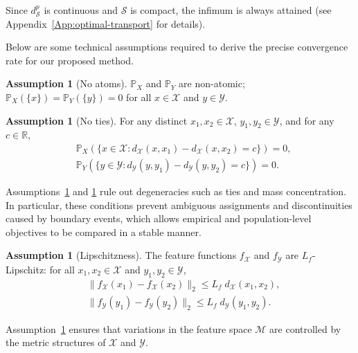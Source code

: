 \documentclass{article}
\theoremstyle{plain}
\theoremstyle{definition}
\newtheorem{assumption}[theorem]{Assumption}
\theoremstyle{remark}
\begin{document}
Since $d_{\mathcal{S}}^p$ is continuous and $\mathcal{S}$ is compact, the infimum is always attained (see Appendix~\ref{App:optimal-transport} for details).

Below are some technical assumptions required to derive the precise convergence rate for our proposed method.
\begin{assumption}[No atoms]
	\label{ass:non-atomic}
	$\mathbb{P}_X$ and $\mathbb{P}_Y$ are non-atomic; $\mathbb{P}_X(\{x\}) = \mathbb{P}_Y(\{y\}) = 0$ for all $x \in \mathcal{X}$ and $y \in \mathcal{Y}$.
\end{assumption}
\begin{assumption}[No ties]
	\label{ass:no-tie}
	For any distinct $x_1,x_2 \in \mathcal{X}$, $y_1,y_2 \in \mathcal{Y}$, and for any $c \in \mathbb{R}$,
	\begin{align*}
		&\mathbb{P}_X(\{x \in \mathcal{X}: d_{\mathcal{X}}(x,x_1) - d_{\mathcal{X}}(x,x_2) = c\}) = 0 ,\\
		&\mathbb{P}_Y(\{y \in \mathcal{Y}: d_{\mathcal{Y}}(y,y_1) - d_{\mathcal{Y}}(y,y_2) = c\}) = 0 .
	\end{align*}
\end{assumption}
Assumptions~\ref{ass:non-atomic} and \ref{ass:no-tie} rule out degeneracies such as ties and mass concentration. In particular, these conditions prevent ambiguous assignments and discontinuities caused by boundary events, which allows empirical and population-level objectives to be compared in a stable manner.

\begin{assumption}[Lipschitzness]
	\label{ass:lipschitz-feature}
	The feature functions $f_{\mathcal{X}}$ and $f_{\mathcal{Y}}$ are $L_f$-Lipschitz: for all $x_1,x_2 \in \mathcal{X}$ and $y_1,y_2 \in \mathcal{Y}$,
	\begin{align*}
		&\| f_{\mathcal{X}}(x_1) - f_{\mathcal{X}}(x_2) \|_2 \leq L_f \; d_{\mathcal{X}}(x_1,x_2) ,\\
		&\| f_{\mathcal{Y}}(y_1) - f_{\mathcal{Y}}(y_2) \|_2 \leq L_f \; d_{\mathcal{Y}}(y_1,y_2) .
	\end{align*}
\end{assumption}
Assumption~\ref{ass:lipschitz-feature} ensures that variations in the feature space $\mathcal{M}$ are controlled by the metric structures of $\mathcal{X}$ and $\mathcal{Y}$.
\end{document}
